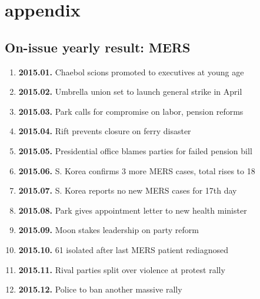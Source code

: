\section{appendix}

\subsection{On-issue yearly result: MERS}
\begin{enumerate}
  \item \textbf{2015.01.} Chaebol scions promoted to executives at young age
  \item \textbf{2015.02.} Umbrella union set to launch general strike in April
  \item \textbf{2015.03.} Park calls for compromise on labor, pension reforms
  \item \textbf{2015.04.} Rift prevents closure on ferry disaster
  \item \textbf{2015.05.} Presidential office blames parties for failed pension bill
  \item \textbf{2015.06.} S. Korea confirms 3 more MERS cases, total rises to 18
  \item \textbf{2015.07.} S. Korea reports no new MERS cases for 17th day
  \item \textbf{2015.08.} Park gives appointment letter to new health minister
  \item \textbf{2015.09.} Moon stakes leadership on party reform
  \item \textbf{2015.10.} 61 isolated after last MERS patient rediagnosed
  \item \textbf{2015.11.} Rival parties split over violence at protest rally
  \item \textbf{2015.12.} Police to ban another massive rally
\end{enumerate}

